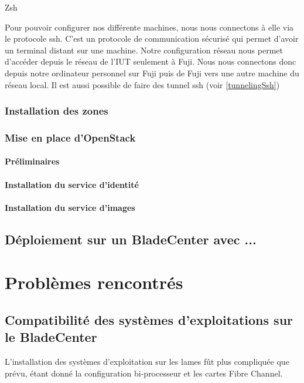 \documentclass[a4paper,oneside]{report}
\begin{document}
Zsh


Pour pouvoir configurer nos différente machines, nous nous connectons à elle via le protocole \gls{ssh}. 
C'est un protocole de communication sécurisé qui permet d'avoir un terminal distant sur une machine.
Notre configuration réseau nous permet d'accéder depuis le réseau de l'IUT seulement à Fuji.
Nous nous connectons donc depuis notre ordinateur personnel sur Fuji puis de Fuji vers une autre machine du réseau local.
Il est aussi possible de faire des tunnel \gls{ssh} (voir \ref{tunnelingSsh})

\subsection{Installation des zones}

\subsection{Mise en place d'OpenStack}
\subsubsection{Préliminaires}

\subsubsection{Installation du service d'identité}

\subsubsection{Installation du service d'images}

\section{Déploiement sur un BladeCenter avec ...}


\chapter{Problèmes rencontrés}
\section{Compatibilité des systèmes d'exploitations sur le BladeCenter}
\label{sec:compatblade}
L'installation des systèmes d'exploitation sur les lames fût plus compliquée que prévu, étant donné la configuration bi-processeur et les cartes Fibre Channel.
\end{document}
